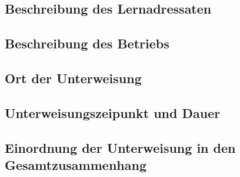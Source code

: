 \subsection{Beschreibung des Lernadressaten}
\subsection{Beschreibung des Betriebs}
\subsection{Ort der Unterweisung}
\subsection{Unterweisungszeipunkt und Dauer}
\subsection{Einordnung der Unterweisung in den Gesamtzusammenhang}

